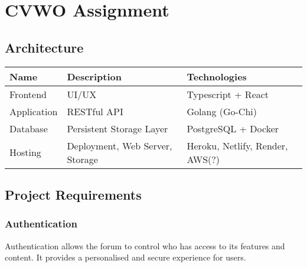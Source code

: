 \documentclass[10pt]{exam}
\date{29 Dec 2022}
\begin{document}
\hypertarget{cvwo-assignment}{%
\section{CVWO Assignment}\label{cvwo-assignment}}


\hypertarget{architecture}{%
\subsection{Architecture}\label{architecture}}

\begin{longtable}[]{@{}lll@{}}
\toprule
Name & Description & Technologies \\
\midrule
\endhead
Frontend & UI/UX & Typescript + React \\
Application & RESTful API & Golang (Go-Chi) \\
Database & Persistent Storage Layer & PostgreSQL + Docker \\
Hosting & Deployment, Web Server, Storage & Heroku, Netlify, Render,
AWS(?) \\
\bottomrule
\end{longtable}

\hypertarget{project-requirements}{%
\subsection{Project Requirements}\label{project-requirements}}

\hypertarget{authentication}{%
\subsubsection{Authentication}\label{authentication}}

Authentication allows the forum to control who has access to its
features and content. It provides a personalised and secure experience
for users.
\end{document}
